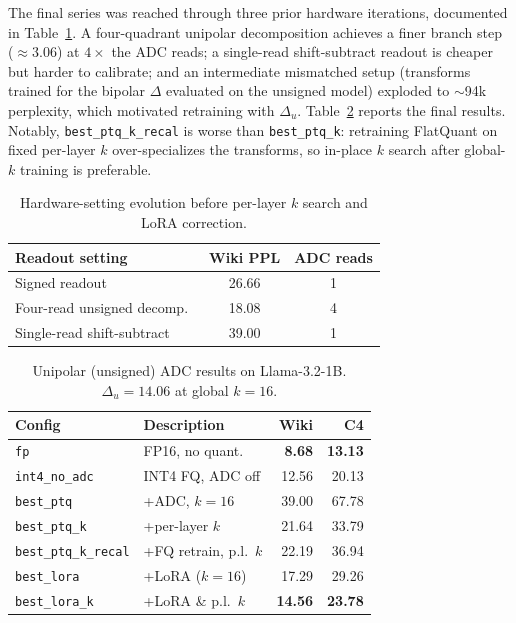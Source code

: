 \documentclass[letterpaper]{article} %
\theoremstyle{plain}
\begin{document}
The final series was reached through three prior hardware iterations, documented in Table~\ref{tab:readout_evolution}. A four-quadrant unipolar decomposition achieves a finer branch step ($\approx 3.06$) at $4\times$ the ADC reads; a single-read shift-subtract readout is cheaper but harder to calibrate; and an intermediate mismatched setup (transforms trained for the bipolar $\Delta$ evaluated on the unsigned model) exploded to $\sim$94k perplexity, which motivated retraining with $\Delta_u$. Table~\ref{tab:unipolar} reports the final results. Notably, \texttt{best\_ptq\_k\_recal} is worse than \texttt{best\_ptq\_k}: retraining FlatQuant on fixed per-layer $k$ over-specializes the transforms, so in-place $k$ search after global-$k$ training is preferable.

\begin{table}[htbp]
\centering
\setlength{\tabcolsep}{4pt}
\begin{tabular}{@{}lcc@{}}
\toprule
\textbf{Readout setting} & \textbf{Wiki PPL} & \textbf{ADC reads} \\
\midrule
Signed readout               & 26.66 & 1 \\
Four-read unsigned decomp.\  & 18.08 & 4 \\
Single-read shift-subtract   & 39.00 & 1 \\
\bottomrule
\end{tabular}
\caption{Hardware-setting evolution before per-layer $k$ search and LoRA correction.}
\label{tab:readout_evolution}
\end{table}

\begin{table}[htbp]
\centering
\setlength{\tabcolsep}{3.5pt}
\begin{tabular}{@{}llrr@{}}
\toprule
\textbf{Config} & \textbf{Description} & \textbf{Wiki} & \textbf{C4} \\
\midrule
\texttt{fp}                 & FP16, no quant.        & \textbf{8.68}  & \textbf{13.13} \\
\texttt{int4\_no\_adc}      & INT4 FQ, ADC off       & 12.56          & 20.13 \\
\texttt{best\_ptq}          & +ADC, $k{=}16$         & 39.00          & 67.78 \\
\texttt{best\_ptq\_k}       & +per-layer $k$         & 21.64          & 33.79 \\
\texttt{best\_ptq\_k\_recal}& +FQ retrain, p.l.\ $k$ & 22.19          & 36.94 \\
\texttt{best\_lora}         & +LoRA ($k{=}16$)       & 17.29          & 29.26 \\
\texttt{best\_lora\_k}      & +LoRA \& p.l.\ $k$     & \textbf{14.56} & \textbf{23.78} \\
\bottomrule
\end{tabular}
\caption{Unipolar (unsigned) ADC results on Llama-3.2-1B. $\Delta_u = 14.06$ at global $k = 16$.}
\label{tab:unipolar}
\end{table}
\end{document}
